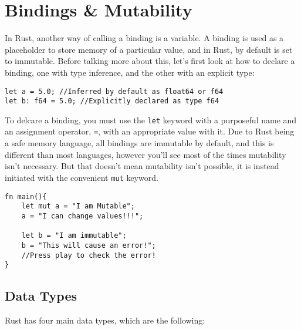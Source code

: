 \chapter{Bindings \& Mutability}
\par In Rust, another way of calling a binding is a variable. A binding is used as a placeholder to store memory of a particular value, and in Rust, by default is set to immutable. Before talking more about this, let's first look at how to declare a binding, one with type inference, and the other with an explicit type: 

\begin{lstlisting}
let a = 5.0; //Inferred by default as float64 or f64
let b: f64 = 5.0; //Explicitly declared as type f64    
\end{lstlisting}


\par To delcare a binding, you must use the \verb!let! keyword with a purposeful name 
and an assignment operator, \verb!=!, with an appropriate value with it. Due to Rust 
being a safe memory language, all bindings are immutable by default, and this is different than most languages, however you'll see most of the times mutability isn't 
necessary. But that doesn't mean mutability isn't possible, it is instead initiated with the convenient \verb!mut! keyword. 

\begin{lstlisting}
fn main(){
    let mut a = "I am Mutable"; 
    a = "I can change values!!!"; 
    
    let b = "I am immutable"; 
    b = "This will cause an error!";
    //Press play to check the error!
}
\end{lstlisting}

\section{Data Types}
Rust has four main data types, which are the following:

